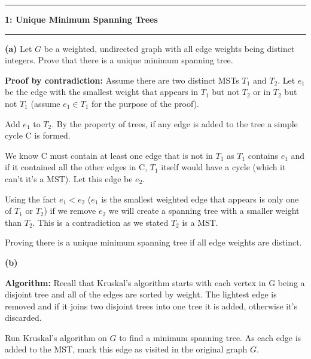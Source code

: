\documentclass[11pt]{article}
\newcommand\question[2]{\vspace{.25in}\hrule\textbf{#1: #2}\vspace{.5em}\hrule\vspace{.10in}}
\renewcommand\part[1]{\vspace{.10in}\textbf{(#1)}}
\newcommand\algorith{\vspace{.10in}\textbf{Algorithm: }}
\begin{document}
\raggedright
\newcommand\NAME{Jake Pitkin}  %
\newcommand\UID{u0891770}     %
\newcommand\HWNUM{3}              %

\question{1}{Unique Minimum Spanning Trees}

\part{a} Let $G$ be a weighted, undirected graph with all edge weights being distinct integers. Prove that there is a unique minimum spanning tree.

\textbf{Proof by contradiction:} Assume there are two distinct MSTs $T_1$ and $T_2$. Let $e_1$ be the edge with the smallest weight that appears in $T_1$ but not $T_2$ or in $T_2$ but not $T_1$ (assume $e_1 \in T_1$ for the purpose of the proof).

	Add $e_1$ to $T_2$. By the property of trees, if any edge is added to the tree a simple cycle C is formed.
	
	We know C must contain at least one edge that is not in $T_1$ as $T_1$ contains $e_1$ and if it contained all the other edges in C, $T_1$ itself would have a cycle (which it can't it's a MST). Let this edge be $e_2$.
	
	Using the fact $e_1 < e_2$ ($e_1$ is the smallest weighted edge that appears is only one of $T_1$ or $T_2$) if we remove $e_2$ we will create a spanning tree with a smaller weight than $T_2$. This is a contradiction as we stated $T_2$ is a MST.
	
	Proving there is a unique minimum spanning tree if all edge weights are distinct.
	
\part{b} 

\algorith Recall that Kruskal's algorithm starts with each vertex in G being a disjoint tree and all of the edges are sorted by weight. The lightest edge is removed and if it joins two disjoint trees into one tree it is added, otherwise it's discarded.

Run Kruskal's algorithm on $G$ to find a minimum spanning tree. As each edge is added to the MST, mark this edge as visited in the original graph $G$.
\end{document}
